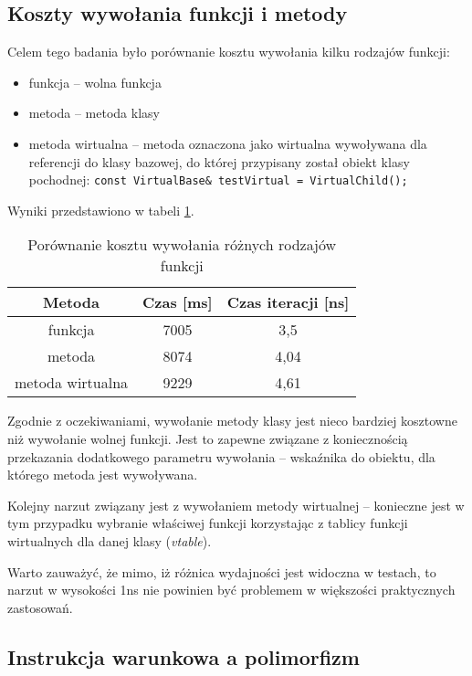 \documentclass{article}
\begin{document}
\subsection{Koszty wywołania funkcji i metody}
Celem tego badania było porównanie kosztu wywołania kilku rodzajów funkcji:
\begin{itemize}
\item funkcja -- wolna funkcja
\item metoda -- metoda klasy
\item metoda wirtualna -- metoda oznaczona jako wirtualna wywoływana dla referencji do klasy bazowej, do której przypisany został obiekt klasy pochodnej: \texttt{const VirtualBase\& testVirtual = VirtualChild();}
\end{itemize}

Wyniki przedstawiono w tabeli \ref{table:fun}.

\begin{table}[H]
\center
\begin{tabular}{ c c c }
  \textbf{Metoda} & \textbf{Czas [ms]} & \textbf{Czas iteracji [ns]} \\ \hline
  funkcja & 7005 & 3,5 \\ \hline
  metoda & 8074 & 4,04\\ \hline
  metoda wirtualna & 9229 & 4,61 \\
\end{tabular}
\caption{Porównanie kosztu wywołania różnych rodzajów funkcji}
\label{table:fun}
\end{table}

Zgodnie z oczekiwaniami, wywołanie metody klasy jest nieco bardziej kosztowne niż wywołanie wolnej funkcji. Jest to zapewne związane z koniecznością przekazania dodatkowego parametru wywołania -- wskaźnika do obiektu, dla którego metoda jest wywoływana.

Kolejny narzut związany jest z wywołaniem metody wirtualnej -- konieczne jest w tym przypadku wybranie właściwej funkcji korzystając z tablicy funkcji wirtualnych dla danej klasy (\textit{vtable}).

Warto zauważyć, że mimo, iż różnica wydajności jest widoczna w testach, to narzut w wysokości 1ns nie powinien być problemem w większości praktycznych zastosowań.

\subsection{Instrukcja warunkowa a polimorfizm}
\end{document}
